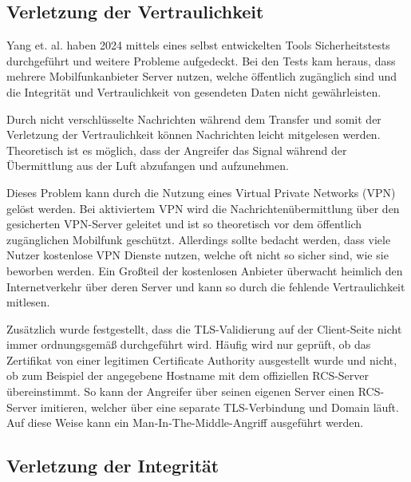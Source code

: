 \documentclass[conference]{IEEEtran}
\begin{document}
\subsection{Verletzung der Vertraulichkeit}

Yang et. al. \cite{uncoversec} haben 2024 mittels eines selbst entwickelten Tools Sicherheitstests durchgeführt und weitere Probleme aufgedeckt.
Bei den Tests kam heraus, dass mehrere Mobilfunkanbieter Server nutzen, welche öffentlich zugänglich sind und die Integrität und Vertraulichkeit von gesendeten Daten nicht gewährleisten.

Durch nicht verschlüsselte Nachrichten während dem Transfer und somit der Verletzung der Vertraulichkeit können Nachrichten leicht mitgelesen werden.
Theoretisch ist es möglich, dass der Angreifer das Signal während der Übermittlung aus der Luft abzufangen und aufzunehmen.

Dieses Problem kann durch die Nutzung eines Virtual Private Networks (VPN) gelöst werden.
Bei aktiviertem VPN wird die Nachrichtenübermittlung über den gesicherten VPN-Server geleitet und ist so theoretisch vor dem öffentlich zugänglichen Mobilfunk geschützt.
Allerdings sollte bedacht werden, dass viele Nutzer kostenlose VPN Dienste nutzen, welche oft nicht so sicher sind, wie sie beworben werden.
Ein Großteil der kostenlosen Anbieter überwacht heimlich den Internetverkehr über deren Server und kann so durch die fehlende Vertraulichkeit mitlesen.

Zusätzlich wurde festgestellt, dass die TLS-Validierung auf der Client-Seite nicht immer ordnungsgemäß durchgeführt wird.
Häufig wird nur geprüft, ob das Zertifikat von einer legitimen Certificate Authority ausgestellt wurde und nicht, ob zum Beispiel der angegebene Hostname mit dem offiziellen RCS-Server übereinstimmt.
So kann der Angreifer über seinen eigenen Server einen RCS-Server imitieren, welcher über eine separate TLS-Verbindung und Domain läuft.
Auf diese Weise kann ein Man-In-The-Middle-Angriff ausgeführt werden.

\subsection{Verletzung der Integrität}
\end{document}
